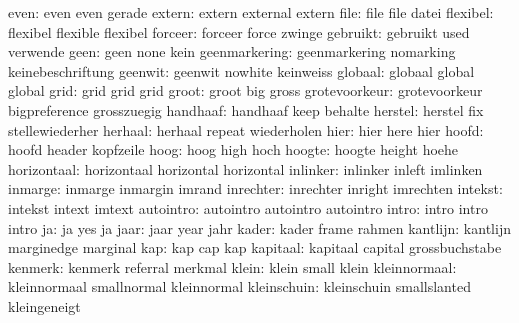                even:  even                 even                gerade
             extern:  extern               external            extern
               file:  file                 file                datei
           flexibel:  flexibel             flexible            flexibel
            forceer:  forceer              force               zwinge
           gebruikt:  gebruikt             used                verwende
               geen:  geen                 none                kein
      geenmarkering:  geenmarkering        nomarking           keinebeschriftung
            geenwit:  geenwit              nowhite             keinweiss
            globaal:  globaal              global              global
               grid:  grid                 grid                grid %
              groot:  groot                big                 gross
      grotevoorkeur:  grotevoorkeur        bigpreference       grosszuegig
           handhaaf:  handhaaf             keep                behalte
            herstel:  herstel              fix                 stellewiederher
            herhaal:  herhaal              repeat              wiederholen
               hier:  hier                 here                hier
              hoofd:  hoofd                header              kopfzeile
               hoog:  hoog                 high                hoch
             hoogte:  hoogte               height              hoehe
        horizontaal:  horizontaal          horizontal          horizontal
           inlinker:  inlinker             inleft              imlinken
            inmarge:  inmarge              inmargin            imrand
          inrechter:  inrechter            inright             imrechten
            intekst:  intekst              intext              imtext
          autointro:  autointro            autointro           autointro
              intro:  intro                intro               intro
                 ja:  ja                   yes                 ja
               jaar:  jaar                 year                jahr
              kader:  kader                frame               rahmen
           kantlijn:  kantlijn             marginedge          marginal
                kap:  kap                  cap                 kap
           kapitaal:  kapitaal             capital             grossbuchstabe
            kenmerk:  kenmerk              referral            merkmal
              klein:  klein                small               klein
       kleinnormaal:  kleinnormaal         smallnormal         kleinnormal
        kleinschuin:  kleinschuin          smallslanted        kleingeneigt
